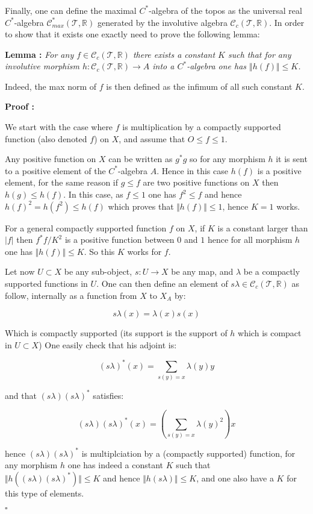 \documentclass[a4paper]{article}
\newcommand{\R}{\mathbb{R}}
\newcommand{\Tcal}{\mathcal{T}}
\newcommand{\Ccal}{\mathcal{C}}
\newcommand{\block}[1]
{

\par \subsubsection{} #1

\bigskip}
\newcommand{\Lem}[1]
	{

	\bigskip
	
	\textbf{Lemma : }{\itshape #1}
		
	\bigskip
	
	}
\newcommand{\Dem}[1]{
	
	\smallskip
	
	\textbf{Proof : } \par
	 {#1} $\square$
	 
	 \bigskip
}
\begin{document}
\block{Finally, one can define the maximal $C^*$-algebra of the topos as the universal real $C^*$-algebra $\Ccal^*_{max}(\Tcal,\R)$ generated by the involutive algebra $\Ccal_c(\Tcal,\R)$. In order to show that it exists one exactly need to prove the following lemma:

\Lem{For any $f \in \Ccal_c(\Tcal,\R)$ there exists a constant $K$ such that for any involutive morphism $h: \Ccal_c(\Tcal,\R) \rightarrow A$ into a $C^*$-algebra one has $\Vert h(f) \Vert \leqslant K$.}

Indeed, the max norm of $f$ is then defined as the infimum of all such constant $K$.

\Dem{We start with the case where $f$ is multiplication by a compactly supported function (also denoted $f$) on $X$, and assume that $O \leqslant f \leqslant 1$. 

Any positive function on $X$ can be written as $g^* g$ so for any morphism $h$ it is sent to a positive element of the $C^*$-algebra $A$. Hence in this case $h(f)$ is a positive element, for the same reason if $g \leqslant f$ are two positive functions on $X$ then $h(g) \leqslant h(f)$. In this case, as $f \leqslant 1$ one has $f^2 \leqslant f $ and hence $h(f)^2 = h(f^2) \leqslant h(f)$ which proves that $\Vert h(f) \Vert \leqslant 1$, hence $K=1$ works.

For a general compactly supported function $f$ on $X$, if $K$ is a constant larger than $|f|$ then $f^*f/K^2$ is a positive function between $0$ and $1$ hence for all morphism $h$ one has $\Vert h(f) \Vert \leqslant K$. So this $K$ works for $f$.

Let now $U \subset X$ be any sub-object, $s: U \rightarrow X$ be any map, and $\lambda$ be a compactly supported functions in $U$. One can then define an element of $s \lambda \in \Ccal_c(\Tcal,\R)$ as follow, internally as a function from $X$ to $X_A$ by:

\[ s\lambda(x)= \lambda(x) s(x) \]

Which is compactly supported (its support is the support of $h$ which is compact in $U \subset X$) One easily check that his adjoint is:

\[ (s\lambda)^* (x) = \sum_{s(y)=x} \lambda(y) y \]

and that $(s\lambda)(s\lambda)^*$ satisfies:

\[ (s\lambda)(s\lambda)^*(x) = \left(\sum_{s(y)=x} \lambda(y)^2 \right) x \] 

hence $(s\lambda)(s\lambda)^*$ is multiplciation by a (compactly supported) function, for any morphism $h$ one has indeed a constant $K$ such that $\Vert h((s\lambda)(s\lambda)^*) \Vert \leqslant K$ and hence $\Vert h(s \lambda) \Vert \leqslant K$, and one also have a $K$ for this type of elements.

}}
\end{document}
